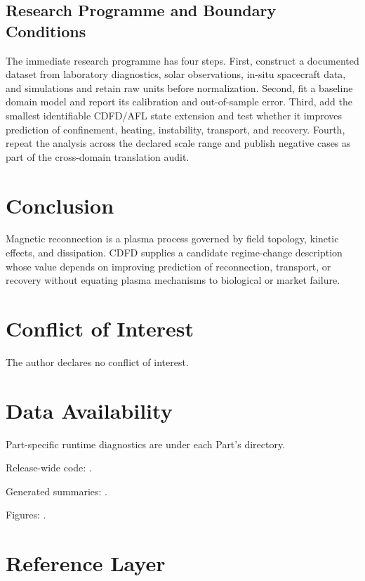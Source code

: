 \documentclass[11pt,a4paper]{article}
\begin{document}
\subsection{Research Programme and Boundary Conditions}

The immediate research programme has four steps. First, construct a documented
dataset from laboratory diagnostics, solar observations, in-situ spacecraft data, and simulations and retain raw units before normalization.
Second, fit a baseline domain model and report its calibration and out-of-sample
error. Third, add the smallest identifiable CDFD/AFL state extension and test
whether it improves prediction of confinement, heating, instability, transport, and recovery. Fourth, repeat the
analysis across the declared scale range and publish negative cases as part of
the cross-domain translation audit.


\section{Conclusion}
Magnetic reconnection is a plasma process governed by field topology, kinetic effects, and dissipation. CDFD supplies a candidate regime-change description whose value depends on improving prediction of reconnection, transport, or recovery without equating plasma mechanisms to biological or market failure.
\section*{Conflict of Interest} The author declares no conflict of interest.
\section*{Data Availability}
Part-specific runtime diagnostics are under each Part's  directory.

Release-wide code: .

Generated summaries: .

Figures: .


\section{Reference Layer}


\end{document}
